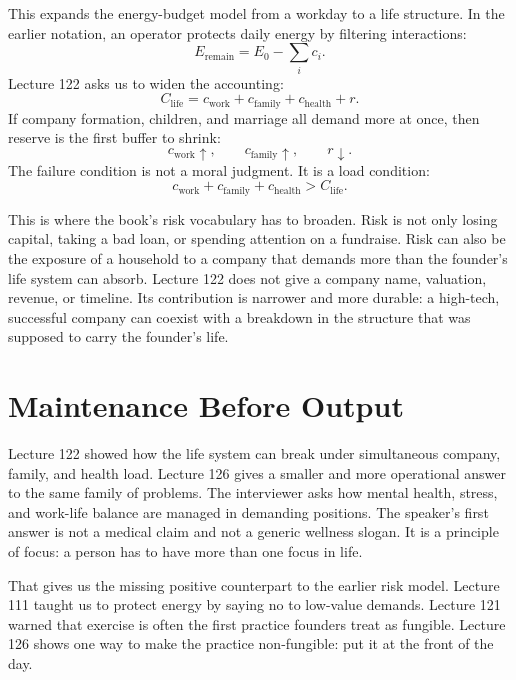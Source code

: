 \documentclass[11pt,oneside]{book}
\begin{document}
This expands the energy-budget model from a workday to a life structure. In the earlier notation, an operator protects daily energy by filtering interactions:
\[
E_{\mathrm{remain}}
=
E_0-\sum_i c_i.
\]
Lecture 122 asks us to widen the accounting:
\[
C_{\mathrm{life}}
=
c_{\text{work}}
+
c_{\text{family}}
+
c_{\text{health}}
+
r.
\]
If company formation, children, and marriage all demand more at once, then reserve is the first buffer to shrink:
\[
c_{\text{work}}\uparrow,\qquad
c_{\text{family}}\uparrow,\qquad
r\downarrow.
\]
The failure condition is not a moral judgment. It is a load condition:
\[
c_{\text{work}}+c_{\text{family}}+c_{\text{health}}>C_{\mathrm{life}}.
\]

This is where the book's risk vocabulary has to broaden. Risk is not only losing capital, taking a bad loan, or spending attention on a fundraise. Risk can also be the exposure of a household to a company that demands more than the founder's life system can absorb. Lecture 122 does not give a company name, valuation, revenue, or timeline. Its contribution is narrower and more durable: a high-tech, successful company can coexist with a breakdown in the structure that was supposed to carry the founder's life.


\section{Maintenance Before Output}

Lecture 122 showed how the life system can break under simultaneous company, family, and health load. Lecture 126 gives a smaller and more operational answer to the same family of problems. The interviewer asks how mental health, stress, and work-life balance are managed in demanding positions. The speaker's first answer is not a medical claim and not a generic wellness slogan. It is a principle of focus: a person has to have more than one focus in life.

That gives us the missing positive counterpart to the earlier risk model. Lecture 111 taught us to protect energy by saying no to low-value demands. Lecture 121 warned that exercise is often the first practice founders treat as fungible. Lecture 126 shows one way to make the practice non-fungible: put it at the front of the day.
\end{document}
